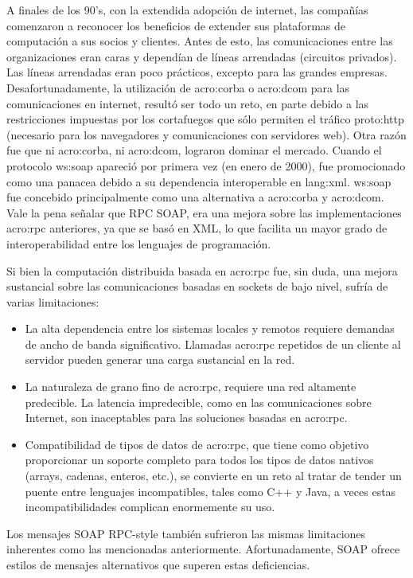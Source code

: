 A finales de los 90’s, con la extendida adopción de internet, las compañías comenzaron a reconocer los beneficios de extender sus plataformas de computación a sus socios y clientes.  Antes de esto, las comunicaciones entre las organizaciones eran caras y dependían de líneas arrendadas (circuitos privados).  Las líneas arrendadas eran poco prácticos, excepto para las grandes empresas.  Desafortunadamente, la utilización de \gls{acro:corba} o \gls{acro:dcom} para las comunicaciones en internet, resultó ser todo un reto, en parte debido a las restricciones impuestas por los cortafuegos que sólo permiten el tráfico \gls{proto:http} (necesario para los navegadores y comunicaciones con servidores web).  Otra razón fue que ni \gls{acro:corba}, ni \gls{acro:dcom}, lograron dominar el mercado.
Cuando el protocolo \gls{ws:soap} apareció por primera vez (en enero de 2000), fue promocionado como una panacea debido a su dependencia interoperable en \gls{lang:xml}. \gls{ws:soap} fue concebido principalmente como una alternativa a \gls{acro:corba} y \gls{acro:dcom}.  Vale la pena señalar que RPC SOAP, era una mejora sobre las implementaciones \gls{acro:rpc} anteriores, ya que se basó en XML, lo que facilita un mayor grado de interoperabilidad entre los lenguajes de programación.

Si bien la computación distribuida basada en \gls{acro:rpc} fue, sin duda, una mejora sustancial sobre las comunicaciones basadas en sockets de bajo nivel, sufría de varias limitaciones:
\begin{itemize}
  \item La alta dependencia entre los sistemas locales y remotos requiere demandas de ancho de banda significativo. Llamadas \gls{acro:rpc} repetidos de un cliente al servidor pueden generar una carga sustancial en la red.
  \item La naturaleza de grano fino de \gls{acro:rpc}, requiere una red altamente predecible. La latencia impredecible, como en las comunicaciones sobre Internet, son inaceptables para las soluciones basadas en \gls{acro:rpc}.
  \item Compatibilidad de tipos de datos de \gls{acro:rpc}, que tiene como objetivo proporcionar un soporte completo para todos los tipos de datos nativos (arrays, cadenas, enteros, etc.), se convierte en un reto al tratar de tender un puente entre lenguajes incompatibles, tales como C++ y Java, a veces estas incompatibilidades complican enormemente su uso.
\end{itemize}

Los mensajes SOAP RPC-style también sufrieron las mismas limitaciones inherentes como las mencionadas anteriormente. Afortunadamente, SOAP ofrece estilos de mensajes alternativos que superen estas deficiencias.

